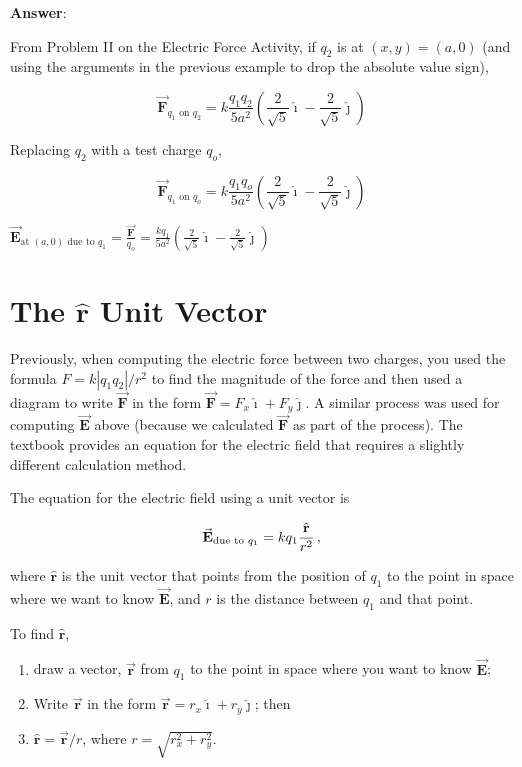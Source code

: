 \documentclass{article}
\newcommand{\ds}[0]{\displaystyle}
\newcommand{\ihat}[0]{\hat{\boldsymbol{\imath}}}
\newcommand{\jhat}[0]{\hat{\boldsymbol{\jmath}}}
\newcommand{\rhat}[0]{\hat{\mathbf{r}}}
\newcommand{\bfvec}[1]{\vec{\mathbf{#1}}}
\begin{document}


\ifsolutions
{\bf Answer}:

From Problem II on the Electric Force Activity, if $q_2$ is at $(x,y)=(a, 0)$ (and using the arguments in the previous example to drop the absolute value sign),

\begin{equation}
\bfvec{F}_{q_1\text{ on } q_2}=k\frac{q_1q_2}{5a^2}\left(\frac{2}{\sqrt{5}}\ihat -\frac{2}{\sqrt{5}}\jhat\right)
\end{equation}

Replacing $q_2$ with a test charge $q_o$,

\begin{equation}
\bfvec{F}_{q_1\text{ on } q_o}=k\frac{q_1q_o}{5a^2}\left(\frac{2}{\sqrt{5}}\ihat -\frac{2}{\sqrt{5}}\jhat\right)
\end{equation}

$\ds\bfvec{E}_{\text{at }(a,0) \text{ due to }q_1} = \frac{\bfvec{F}}{q_o}=\frac{kq_1}{5a^2}\left(\frac{2}{\sqrt{5}}\ihat -\frac{2}{\sqrt{5}}\jhat\right)$
\fi

\newpage

\section{The $\rhat$ Unit Vector}

Previously, when computing the electric force between two charges, you used the formula $F=k{|q_1q_2|}/{r^2}$ to find the magnitude of the force and then used a diagram to write $\bfvec{F}$ in the form $\bfvec{F}=F_x\ihat + F_y\jhat$. A similar process was used for computing $\bfvec{E}$ above (because we calculated $\bfvec{F}$ as part of the process). The textbook provides an equation for the electric field that requires a slightly different calculation method.

The equation for the electric field using a unit vector is

\begin{equation}
\bfvec{E}_{\text{due to }q_1}=kq_1\frac{\rhat}{r^2}\thinspace,
\end{equation}

where $\rhat$ is the unit vector that points from the position of $q_1$ to the point in space where we want to know $\bfvec{E}$, and $r$ is the distance between $q_1$ and that point.

To find $\rhat$, 

\begin{enumerate}

  \item draw a vector, $\bfvec{r}$ from $q_1$ to the point in space where you want to know $\bfvec{E}$;

  \item Write $\bfvec{r}$ in the form $\bfvec{r}=r_x\ihat+r_y\jhat$; then

  \item $\rhat=\bfvec{r}/r$, where $r=\sqrt{r_x^2+r_y^2}$.

\end{enumerate}
\end{document}
